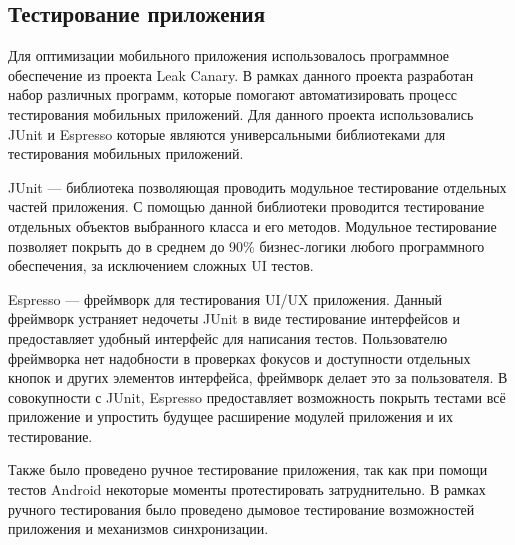 \subsection{Тестирование приложения}
Для оптимизации мобильного приложения использовалось программное обеспечение из проекта Leak Canary. В рамках данного проекта разработан набор различных программ, которые помогают автоматизировать процесс тестирования мобильных приложений. Для данного проекта использовались JUnit и Espresso которые являются универсальными библиотеками для тестирования мобильных приложений.

JUnit — библиотека позволяющая проводить модульное тестирование отдельных частей приложения. С помощью данной библиотеки проводится тестирование отдельных объектов выбранного класса и его методов. Модульное тестирование позволяет покрыть до в среднем до 90\% бизнес-логики любого программного обеспечения, за исключением сложных UI тестов.

Espresso — фреймворк для тестирования UI/UX приложения. Данный фреймворк устраняет недочеты JUnit в виде тестирование интерфейсов и предоставляет удобный интерфейс для написания тестов. Пользователю фреймворка нет надобности в проверках фокусов и доступности отдельных кнопок и других элементов интерфейса, фреймворк делает это за пользователя. В совокупности с JUnit, Espresso предоставляет возможность покрыть тестами всё приложение и упростить будущее расширение модулей приложения и их тестирование.
 
Также было проведено ручное тестирование приложения, так как при помощи тестов Android некоторые моменты протестировать затруднительно. В рамках ручного тестирования было проведено дымовое тестирование возможностей приложения и механизмов синхронизации.


